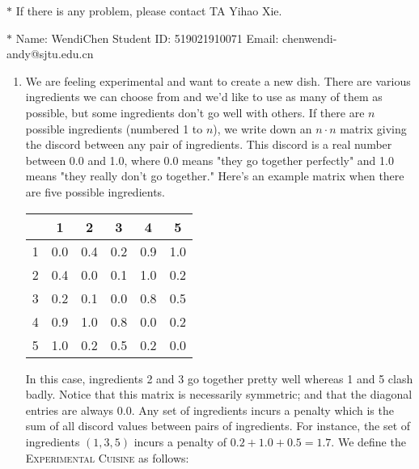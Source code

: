 \documentclass[12pt,a4paper]{article}
\theoremstyle{definition}
\begin{document}
\noindent

\noindent{}
\begin{center}
\footnotesize{\color{red}$*$ If there is any problem, please contact TA Yihao Xie. }

\footnotesize{\color{blue}$*$ Name: WendiChen  \quad Student ID: 519021910071 \quad Email: chenwendi-andy@sjtu.edu.cn}
\end{center}

\begin{enumerate}
    \item We are feeling experimental and want to create a new dish. There are various ingredients we can choose from and we'd like to use as many of them as possible, but some ingredients don't go well with others. If there are $n$ possible ingredients (numbered 1 to $n$), we write down an $n\cdot n$ matrix giving the discord between any pair of ingredients. This discord is a real number between 0.0 and 1.0, where 0.0 means "they go together perfectly" and 1.0 means "they really don't go together." Here's an example matrix when there are five possible ingredients.
    \begin{center}
        \begin{tabular}{|c|ccccc|}
        \hline
             & 1  & 2 & 3 & 4 & 5\\
        \hline
            1 & 0.0 & 0.4 & 0.2 & 0.9 & 1.0\\
            2 & 0.4 & 0.0 & 0.1 & 1.0 & 0.2\\
            3 & 0.2 & 0.1 & 0.0 & 0.8 & 0.5\\
            4 & 0.9 & 1.0 & 0.8 & 0.0 & 0.2\\
            5 & 1.0 & 0.2 & 0.5 & 0.2 & 0.0\\
        \hline
        \end{tabular}
    \end{center}
    In this case, ingredients 2 and 3 go together pretty well whereas 1 and 5 clash badly. Notice that this matrix is necessarily symmetric; and that the diagonal entries are always 0.0. Any set of ingredients incurs a penalty which is the sum of all discord values between pairs of ingredients. For instance, the set of ingredients $(1,3,5)$ incurs a penalty of $0.2+1.0+0.5 = 1.7$. We define the \textsc{Experimental Cuisine} as follows:


\end{enumerate}
\end{document}
